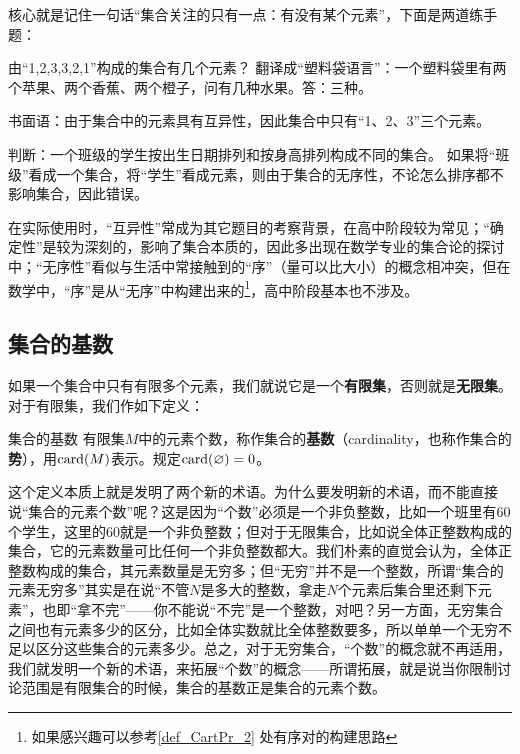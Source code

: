 核心就是记住一句话“集合关注的只有一点：有没有某个元素”，下面是两道练手题：

\begin{example}{由“1,2,3,3,2,1”构成的集合有几个元素？}
翻译成“塑料袋语言”：一个塑料袋里有两个苹果、两个香蕉、两个橙子，问有几种水果。答：三种。

书面语：由于集合中的元素具有互异性，因此集合中只有“1、2、3”三个元素。
\end{example}

\begin{example}{判断：一个班级的学生按出生日期排列和按身高排列构成不同的集合。}
如果将“班级”看成一个集合，将“学生”看成元素，则由于集合的无序性，不论怎么排序都不影响集合，因此错误。
\end{example}

在实际使用时，“互异性”常成为其它题目的考察背景，在高中阶段较为常见；“确定性”是较为深刻的，影响了集合本质的，因此多出现在数学专业的集合论的探讨中；“无序性”看似与生活中常接触到的“序”（量可以比大小）的概念相冲突，但在数学中，“序”是从“无序”中构建出来的\footnote{如果感兴趣可以参考\autoref{def_CartPr_2} 处有序对的构建思路}，高中阶段基本也不涉及。

\subsection{集合的基数}


如果一个集合中只有有限多个元素，我们就说它是一个\textbf{有限集}，否则就是\textbf{无限集}。对于有限集，我们作如下定义：
\begin{definition}{集合的基数}
有限集$M$中的元素个数，称作集合的\textbf{基数}（cardinality，也称作集合的\textbf{势}），用${\rm card}(M)$表示。规定${\rm card}(\varnothing)=0$。
\end{definition}


这个定义本质上就是发明了两个新的术语。为什么要发明新的术语，而不能直接说“集合的元素个数”呢？这是因为“个数”必须是一个非负整数，比如一个班里有$60$个学生，这里的$60$就是一个非负整数；但对于无限集合，比如说全体正整数构成的集合，它的元素数量可比任何一个非负整数都大。我们朴素的直觉会认为，全体正整数构成的集合，其元素数量是无穷多；但“无穷”并不是一个整数，所谓“集合的元素无穷多”其实是在说“不管$N$是多大的整数，拿走$N$个元素后集合里还剩下元素”，也即“拿不完”——你不能说“不完”是一个整数，对吧？另一方面，无穷集合之间也有元素多少的区分，比如全体实数就比全体整数要多，所以单单一个无穷不足以区分这些集合的元素多少。总之，对于无穷集合，“个数”的概念就不再适用，我们就发明一个新的术语，来拓展“个数”的概念——所谓拓展，就是说当你限制讨论范围是有限集合的时候，集合的基数正是集合的元素个数。

